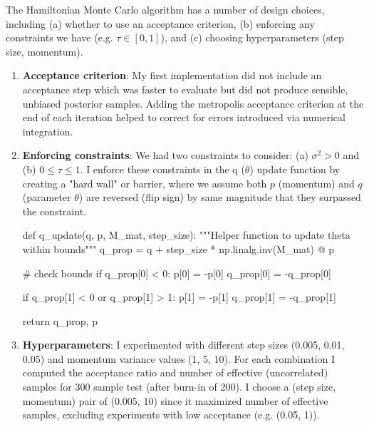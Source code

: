 \documentclass[12pt,letterpaper,twoside]{article}
\begin{document}
The Hamiltonian Monte Carlo algorithm has a number of design 
choices, including (a) whether to use an acceptance criterion, 
(b) enforcing any constraints we have (e.g. $\tau \in [0,1]$), 
and (c) choosing hyperparameters (step size, momentum).

\begin{enumerate}[label=(\alph*)]
\item \textbf{Acceptance criterion}: My first implementation did not 
include an acceptance step which was faster to evaluate but did 
not produce sensible, unbiased posterior samples. Adding the 
metropolis acceptance criterion at the end of each iteration 
helped to correct for errors introduced via numerical 
integration.

\item \textbf{Enforcing constraints}: We had two constraints to consider: 
(a) $\sigma^2 > 0$ and (b) $0 \le \tau \le 1$. I enforce these 
constraints in the q ($\theta$) update function by creating a 
"hard wall" or barrier, where we assume both $p$ (momentum) and 
$q$ (parameter $\theta$) are reversed (flip sign) by same magnitude 
that they surpassed the constraint.

\begin{python}
def q_update(q, p, M_mat, step_size):
    """Helper function to update theta within bounds"""
    q_prop = q + step_size * np.linalg.inv(M_mat) @ p

    # check bounds
    if q_prop[0] < 0:
        p[0] = -p[0]
        q_prop[0] = -q_prop[0]

    if q_prop[1] < 0 or q_prop[1] > 1:
        p[1] = -p[1]
        q_prop[1] = -q_prop[1]

    return q_prop, p
\end{python}

\item \textbf{Hyperparameters}: I experimented with different step 
sizes (0.005, 0.01, 0.05) and momentum variance values (1, 5, 10). 
For each combination I computed the acceptance ratio and number of 
effective (uncorrelated) samples for 300 sample test (after 
burn-in of 200). I choose a (step size, momentum) pair of 
(0.005, 10) since it maximized number of effective samples, 
excluding experiments with low acceptance (e.g. (0.05, 1)).


\end{enumerate}
\end{document}
